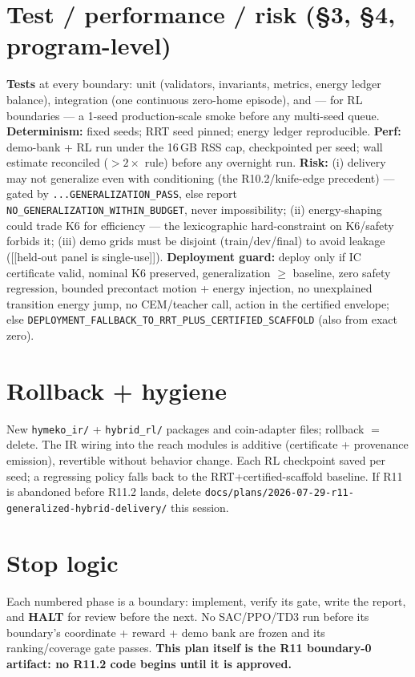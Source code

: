 \documentclass[11pt]{article}
\newcommand{\code}[1]{\texttt{\small #1}}
\newcommand{\halt}{\textcolor{red!70!black}{\textbf{HALT}}}
\newcommand{\gate}[1]{\textcolor{blue!55!black}{\texttt{\small #1}}}
\begin{document}
\section{Test / performance / risk (\S3, \S4, program-level)}
\textbf{Tests} at every boundary: unit (validators, invariants, metrics, energy ledger balance), integration (one
continuous zero-home episode), and --- for RL boundaries --- a 1-seed production-scale smoke before any multi-seed queue.
\textbf{Determinism:} fixed seeds; RRT seed pinned; energy ledger reproducible. \textbf{Perf:} demo-bank + RL run under the
16\,GB RSS cap, checkpointed per seed; wall estimate reconciled ($>2\times$ rule) before any overnight run.
\textbf{Risk:} (i) delivery may not generalize even with conditioning (the R10.2/knife-edge precedent) --- gated by
\gate{...GENERALIZATION\_PASS}, else report \code{NO\_GENERALIZATION\_WITHIN\_BUDGET}, never impossibility; (ii)
energy-shaping could trade K6 for efficiency --- the lexicographic hard-constraint on K6/safety forbids it; (iii) demo
grids must be disjoint (train/dev/final) to avoid leakage ([[held-out panel is single-use]]).
\textbf{Deployment guard:} deploy only if IC certificate valid, nominal K6 preserved, generalization $\geq$ baseline, zero
safety regression, bounded precontact motion + energy injection, no unexplained transition energy jump, no CEM/teacher
call, action in the certified envelope; else \code{DEPLOYMENT\_FALLBACK\_TO\_RRT\_PLUS\_CERTIFIED\_SCAFFOLD} (also from
exact zero).

\section{Rollback + hygiene}
New \code{hymeko\_ir/} + \code{hybrid\_rl/} packages and coin-adapter files; rollback $=$ delete. The IR wiring into the
reach modules is additive (certificate + provenance emission), revertible without behavior change. Each RL checkpoint saved
per seed; a regressing policy falls back to the RRT+certified-scaffold baseline. If R11 is abandoned before R11.2 lands,
delete \code{docs/plans/2026-07-29-r11-generalized-hybrid-delivery/} this session.

\section{Stop logic}
Each numbered phase is a boundary: implement, verify its gate, write the report, and \halt{} for review before the next.
No SAC/PPO/TD3 run before its boundary's coordinate + reward + demo bank are frozen and its ranking/coverage gate passes.
\textbf{This plan itself is the R11 boundary-0 artifact: no R11.2 code begins until it is approved.}
\end{document}
